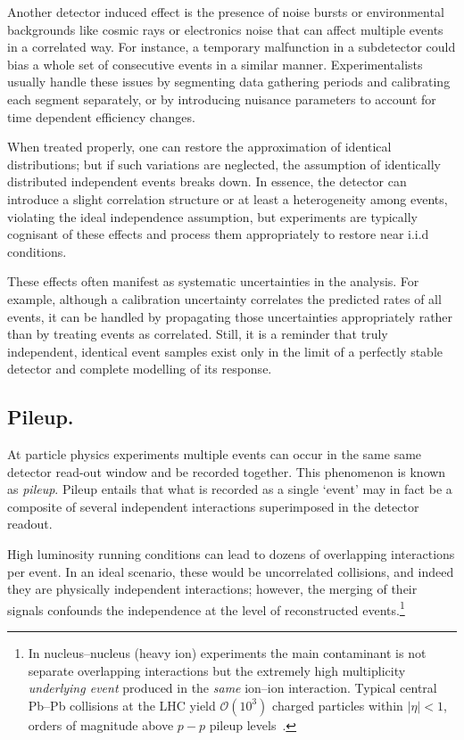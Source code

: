         Another detector induced effect is the presence of noise bursts or environmental backgrounds like cosmic rays or electronics noise that can affect multiple events in a correlated way.
        For instance, a temporary malfunction in a subdetector could bias a whole set of consecutive events in a similar manner.
        Experimentalists usually handle these issues by segmenting data gathering periods and calibrating each segment separately, or by introducing nuisance parameters to account for time dependent efficiency changes.
        
        When treated properly, one can restore the approximation of identical distributions;
        but if such variations are neglected, the assumption of identically distributed independent events breaks down.
        In essence, the detector can introduce a slight correlation structure or at least a heterogeneity among events, violating the ideal independence assumption, but experiments are typically cognisant of these effects and process them appropriately to restore near i.i.d conditions.
        
        These effects often manifest as systematic uncertainties in the analysis.
        For example, although a calibration uncertainty correlates the predicted rates of all events, it can be handled by propagating those uncertainties appropriately rather than by treating events as correlated.
        Still, it is a reminder that truly independent, identical event samples exist only in the limit of a perfectly stable detector and complete modelling of its response.
    
    \subsection{Pileup.}
        \begin{definition}[Pileup]
        At particle physics experiments multiple events can occur in the same same detector read-out window and be recorded together.
        This phenomenon is known as \emph{pileup}.
        Pileup entails that what is recorded as a single `event' may in fact be a composite of several independent interactions superimposed in the detector readout.
        \end{definition}
        
        High luminosity running conditions can lead to dozens of overlapping interactions per event.
        In an ideal scenario, these would be uncorrelated collisions, and indeed they are physically independent interactions; however, the merging of their signals confounds the independence at the level of reconstructed events.\footnote{
        In nucleus--nucleus (heavy ion) experiments the main contaminant is not separate overlapping interactions but the extremely high multiplicity
        \emph{underlying event} produced in the \emph{same} ion--ion interaction.
        Typical central Pb--Pb collisions at the LHC yield $\mathcal{O}(10^{3})$ charged
        particles within $|\eta|<1$, orders of magnitude above $p-p$ pileup levels~\cite{CMS:2006myw, ALICE:2012nbx}.
        }
        
